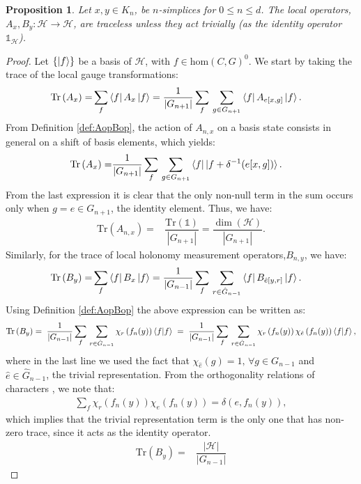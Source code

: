 \documentclass[%
nofootinbib,
 amsmath,amssymb,
aps,
]{revtex4-1}
\theoremstyle{plain}%
\newtheorem{prop}[thm]{Proposition}
\theoremstyle{definition}
\theoremstyle{remark}
\def\hom{\text{hom}(C,G)}
\begin{document}
\begin{prop}\label{prop:traceless}
Let \(x,y \in K_n\), be $n$-simplices for \(0\leq n\leq d\). The local operators, \(A_{x}, B_{y}:\mathcal{H}\rightarrow\mathcal{H}\), are traceless unless they act  trivially (as the identity operator \(\mathbb{1}_\mathcal{H}\)).
\end{prop}
\begin{proof}
Let \(\{\ket{f}\}\) be a basis of $\mathcal{H}$, with \(f \in \hom^0\). We start by taking the trace of the local gauge transformations:
\begin{align*}
\text{Tr}\left(A_{x}\right) = & \sum_{f} \bra{f} A_{x} \ket{f} = \dfrac{1}{\left|G_{n+1}\right|}\sum_{f}\, \sum_{g \in G_{n+1}} \bra{f} A_{e[x,g]} \ket{f}.
\end{align*}
From Definition \ref{def:AopBop}, the action of \(A_{n,x}\) on a basis state consists in general on a shift of basis elements, which yields:
\begin{align*}
\text{Tr}\left(A_{x}\right) =&  \dfrac{1}{\left|G_{n+1}\right|}\sum_{f}\, \sum_{g \in G_{n+1}} \bra{f}  \ket{f+ \delta^{-1}(e[x,g])}.
\end{align*}
From the last expression it is clear that the only non-null term in the sum occurs only when \(g=e \in G_{n+1}\), the identity element. Thus, we have:
\begin{align*}
\text{Tr}\left(A_{n,x}\right) =& \dfrac{\text{Tr}\left(\mathbb{1}\right)}{\left|G_{n+1}\right|} = \dfrac{\dim(\mathcal{H})}{\left|G_{n+1}\right|}.
\end{align*}
 Similarly, for the trace of local holonomy measurement operators,\(B_{n,y}\), we have:
\begin{align*}
\text{Tr}\left(B_{y}\right) = & \sum_{f} \bra{f} B_{x} \ket{f} = \dfrac{1}{\left|G_{n-1}\right|}\sum_{f}\, \sum_{r \in \hat{G}_{n-1}} \bra{f} B_{\hat{e}[y,r]} \ket{f}. 
\end{align*}
Using Definition \ref{def:AopBop} the above expression can be written as:
\begin{align*}
\text{Tr}\left(B_{y}\right) =\;  \dfrac{1}{\left|G_{n-1}\right|}\sum_{f}\, \sum_{r \in \hat{G}_{n-1}} \chi_r\left({f_n(y)}\right)\braket{f|f}\;
=\;  \dfrac{1}{\left|G_{n-1}\right|}\sum_{f}\, \sum_{r \in \hat{G}_{n-1}} \chi_r\left({f_n(y)}\right)\chi_{\hat{e}}\left({f_n(y)}\right)\braket{f|f},
\end{align*}
where in the last line we used the fact that \(\chi_{\hat{e}}(g)=1, \, \forall g \in G_{n-1}\) and \(\hat{e} \in \hat{G}_{n-1}\), the trivial representation. From the orthogonality relations of characters \cite{hall, barut,serre, james}, we note that:
\begin{align*}
\sum_{f}\chi_r\left({f_n(y)}\right)\chi_e\left({f_n(y)}\right) = \delta(e,f_n(y)), 
\end{align*}
which implies that the trivial representation term is the only one that has non-zero trace, since it acts as the identity operator.
\begin{align*}
\text{Tr}\left(B_{y}\right) = & \dfrac{\left|\mathcal{H}\right|}{\left|G_{n-1}\right|}
\end{align*}
\end{proof}
\end{document}

